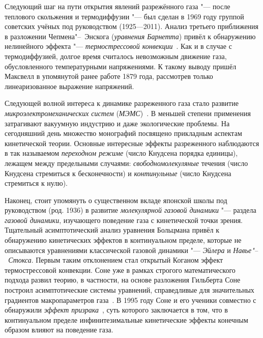 \documentclass[a4paper, 12pt, oneside]{article} %
\begin{document}
Следующий шаг на пути открытия явлений разрежённого газа "---
после теплового скольжения и термодиффузии "--- был сделан в 1969 году
группой советских учёных под руководством 
(1925---2011). Анализ третьего приближения в разложении
Чепмена"--~Энскога (\emph{уравнения Барнетта}) привёл к обнаружению
нелинейного эффекта "--- \emph{термострессовой
конвекции}~\cite{kogan1976stresses}. Как и в случае с термодиффузией,
долгое время считалось невозможным движение газа, обусловленного
температурными напряжениями. К такому выводу пришёл Максвелл в
упомянутой ранее работе 1879 года, рассмотрев только линеаризованное
выражение напряжений.  

Следующей волной интереса к динамике разреженного газа стало развитие
\emph{микроэлектромеханических систем}
(\emph{МЭМС})~\cite{karniadakis2006microflows}. В меньшей степени
применения затрагивают вакуумную индустрию и даже экологические
проблемы. На сегодняшний день множество монографий посвящено прикладным
аспектам кинетической теории. Основные интересные эффекты разреженного
наблюдаются в так называемом \emph{переходном режиме} (число Кнудсена
порядка единицы), лежащем между предельными случаями:
\emph{свободномолекуляные} течения (число Кнудсена стремиться к
бесконечности) и \emph{континульные} (число Кнудсена стремиться к нулю).

Наконец, стоит упомянуть о существенном вкладе японской школы под
руководством  (род. 1936) в развитие
\emph{молекулярной газовой динамики} "--- раздела \emph{газовой
динамики}, изучающего поведение газа с кинетической точки зрения.
Тщательный асимптотический анализ уравнения Больцмана привёл к
обнаружению кинетических эффектов в континуальном пределе, которые не
описываются уравнениями классической газовой динамики "--- \emph{Эйлера}
и \emph{Навье"--~Стокса}. Первым таким отклонением стал открытый Коганом
эффект термострессовой конвекции. Соне уже в рамках строгого
математического подхода развил теорию, в частности, на основе разложения
Гильберта Соне построил асимптотические системы уравнений, справедливые
для значительных градиентов макропараметров
газа~\cite{sone2007molecular}. В 1995 году Соне и его ученики совместно
с  обнаружили \emph{эффект
призрака}~\cite{sone1996ghost}, суть которого заключается в том, что в
континуальном пределе инфинитезимальные кинетические эффекты конечным
образом влияют на поведение газа.
\end{document}
